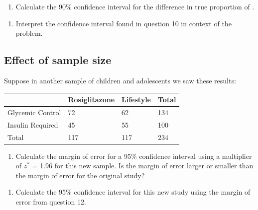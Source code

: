 \documentclass[
]{report}
\providecommand{\tightlist}{%
  \setlength{\itemsep}{0pt}\setlength{\parskip}{0pt}}
\begin{document}
\begin{enumerate}
\def\labelenumi{\arabic{enumi}.}
\setcounter{enumi}{9}
\tightlist
\item
  Calculate the 90\% confidence interval for the difference in true proportion of .
\end{enumerate}

\vspace{1in}

\begin{enumerate}
\def\labelenumi{\arabic{enumi}.}
\setcounter{enumi}{10}
\tightlist
\item
  Interpret the confidence interval found in question 10 in context of the problem.
\end{enumerate}

\vspace{1in}

\hypertarget{effect-of-sample-size-2}{%
\subsection{Effect of sample size}\label{effect-of-sample-size-2}}

Suppose in another sample of children and adolescents we saw these results:

\begin{longtable}[]{@{}llll@{}}
\toprule
& Rosiglitazone & Lifestyle & Total \\
\midrule
\endhead
Glycemic Control & 72 & 62 & 134 \\
Insulin Required & 45 & 55 & 100 \\
Total & 117 & 117 & 234 \\
\bottomrule
\end{longtable}

\begin{enumerate}
\def\labelenumi{\arabic{enumi}.}
\setcounter{enumi}{11}
\tightlist
\item
  Calculate the margin of error for a 95\% confidence interval using a multiplier of \(z^*\) = 1.96 for this new sample. Is the margin of error larger or smaller than the margin of error for the original study?
\end{enumerate}

\vspace{.8in}

\begin{enumerate}
\def\labelenumi{\arabic{enumi}.}
\setcounter{enumi}{12}
\tightlist
\item
  Calculate the 95\% confidence interval for this new study using the margin of error from question 12.
\end{enumerate}
\end{document}
